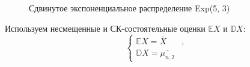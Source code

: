 \documentclass{article}
\begin{document}
\begin{figure}[H]
	\caption{Сдвинутое экспоненциальное распределение Exp(5, 3)}
	\label{fig:image}
\end{figure}

Используем несмещенные и СК-состоятельные оценки $\mathbb{E}X$ и $\mathbb{D}X$:
\begin{equation*}
	\begin{cases}
		\mathbb{E}X = \overline{X} &,\\
		\mathbb{D}X = \overline{\mu_{n, 2}}
	\end{cases}
\end{equation*}
\end{document}
